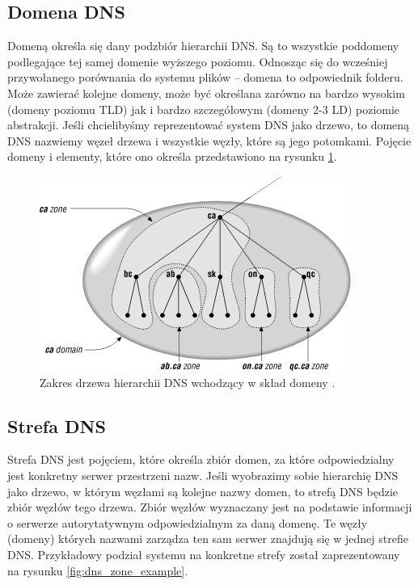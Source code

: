 \subsection{Domena DNS}
Domeną określa się dany podzbiór hierarchii DNS. Są to wszystkie poddomeny podlegające tej samej domenie wyższego poziomu. Odnosząc
się do wcześniej przywołanego porównania do systemu plików -- domena to odpowiednik folderu. Może zawierać kolejne domeny, może być
określana zarówno na bardzo wysokim (domeny poziomu TLD) jak i bardzo szczegółowym (domeny 2-3 LD) poziomie abstrakcji. Jeśli
chcielibyśmy reprezentować system DNS jako drzewo, to domeną DNS nazwiemy węzeł drzewa i wszystkie węzły, które są jego potomkami.
Pojęcie domeny i elementy, które ono określa przedstawiono na rysunku \ref{fig:domain_dns_example}.

\begin{center}
	\begin{figure}
	\includegraphics[scale=0.8]{image/domain_example}
	\caption{Zakres drzewa hierarchii DNS wchodzący w skład domeny \cite{domain_example}.}
	\label{fig:domain_dns_example}
	\end{figure}
\end{center}

\subsection{Strefa DNS}
Strefa DNS jest pojęciem, które określa zbiór domen, za które odpowiedzialny jest konkretny serwer przestrzeni nazw. Jeśli wyobrazimy
sobie hierarchię DNS jako drzewo, w którym węzłami są kolejne nazwy domen, to strefą DNS będzie zbiór węzłów tego drzewa. Zbiór
węzłów wyznaczany jest na podstawie informacji o serwerze autorytatywnym odpowiedzialnym za daną domenę. Te węzły (domeny)
których nazwami zarządza ten sam serwer znajdują się w jednej strefie DNS. Przykładowy podział systemu na konkretne strefy został
zaprezentowany na rysunku \ref{fig:dns_zone_example}.

